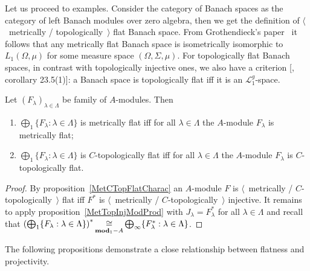 Let us proceed to examples. Consider the category of Banach spaces as 
the category of left Banach modules over zero algebra, then we get the 
definition of $\langle$~metrically / topologically~$\rangle$ flat Banach space. 
From Grothendieck's paper~\cite{GrothMetrProjFlatBanSp} it follows that any 
metrically flat Banach space is isometrically isomorphic to $L_1(\Omega,\mu)$ 
for some measure space $(\Omega,\Sigma,\mu)$. For topologically flat Banach 
spaces, in contrast with topologically injective ones, we also have a criterion
[\cite{DefFloTensNorOpId}, corollary 23.5(1)]: a Banach space is topologically
flat iff it is an $\mathscr{L}_1^g$-space.

\begin{proposition}\label{MetTopFlatModCoProd} Let
${(F_\lambda)}_{\lambda\in\Lambda}$ be family of $A$-modules. Then 

\begin{enumerate}[label = (\roman*)]
    \item $\bigoplus_1 \{F_\lambda:\lambda\in\Lambda \}$ is metrically flat iff
    for all $\lambda\in\Lambda$ the $A$-module $F_\lambda$ is metrically flat;

    \item $\bigoplus_1 \{F_\lambda:\lambda\in\Lambda \}$ is $C$-topologically
    flat iff for all $\lambda\in\Lambda$ the $A$-module $F_\lambda$ is
    $C$-topologically flat.
\end{enumerate}
\end{proposition}
\begin{proof} By proposition~\ref{MetCTopFlatCharac} an $A$-module $F$ 
is $\langle$~metrically / $C$-topologically~$\rangle$ flat iff $F^*$ 
is $\langle$~metrically / $C$-topologically~$\rangle$ injective. 
It remains to apply
proposition~\ref{MetTopInjModProd} with $J_\lambda=F_\lambda^*$ for all
$\lambda\in\Lambda$ and recall that 
${\left(\bigoplus_1 \{
    F_\lambda:\lambda\in\Lambda \}
\right)}^*
\mathop{\mathbin{\cong}}\limits_{\mathbf{mod}_1-A}
\bigoplus_\infty \{ F_\lambda^*:\lambda\in\Lambda \}$.
\end{proof}

The following propositions demonstrate a close relationship between flatness and
projectivity.

